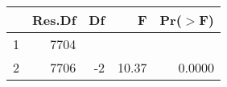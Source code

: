 \begin{table}[ht]
\centering
\begin{tabular}{lrrrr}
  \hline
 & Res.Df & Df & F & Pr($>$F) \\ 
  \hline
1 & 7704 &  &  &  \\ 
  2 & 7706 & -2 & 10.37 & 0.0000 \\ 
   \hline
\end{tabular}
\end{table}
